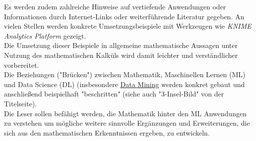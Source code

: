 \documentclass[12pt]{article}
\begin{document}
Es werden zudem zahlreiche Hinweise auf vertiefende Anwendungen oder Informationen durch Internet-Links oder weiterführende Literatur gegeben. An vielen Stellen werden konkrete Umsetzungsbeispiele mit Werkzeugen wie \textit{KNIME Analytics Platform} gezeigt. \\
Die Umsetzung dieser Beispiele in allgemeine mathematische Aussagen unter  Nutzung des mathematischen Kalküls wird damit leichter und verständlicher vorbereitet.\\[0.1cm]
%
Die Beziehungen ("Brücken") zwischen Mathematik, Maschinellen Lernen (ML) und Data Science (DL) (insbesondere \href{https://en.wikipedia.org/wiki/Data_mining}{Data Mining} werden konkret gebaut und anschließend beispielhaft "beschritten" (siehe auch "3-Insel-Bild" von der Titelseite).\\[0.2cm] 
%
Die Leser sollen befähigt werden, die Mathematik hinter den ML Anwendungen zu verstehen um mögliche weitere sinnvolle Ergänzungen und Erweiterungen, die sich aus den mathematischen Erkenntnissen ergeben, zu entwickeln.\\
\end{document}
